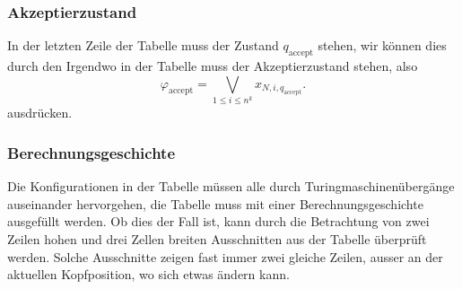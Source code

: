 \subsubsection{Akzeptierzustand}
In der letzten Zeile der Tabelle muss der Zustand $q_\text{accept}$ stehen,
wir können dies durch den 
Irgendwo in der Tabelle muss der Akzeptierzustand stehen, also
\[
\varphi_{\text{accept}} 
=
\bigvee_{1\le i\le n^k} x_{N,i,q_{\text{accept}}}.
\]
ausdrücken.

\subsubsection{Berechnungsgeschichte}
Die Konfigurationen in der Tabelle müssen alle durch
Turingmaschinenübergänge auseinander hervorgehen, die Tabelle muss
mit einer Berechnungsgeschichte ausgefüllt werden.
Ob dies der Fall ist, kann durch die Betrachtung von zwei Zeilen
hohen und drei Zellen breiten Ausschnitten aus der Tabelle
überprüft werden.
Solche Ausschnitte zeigen fast immer zwei
gleiche Zeilen, ausser an der aktuellen Kopfposition, wo
sich etwas ändern kann.

